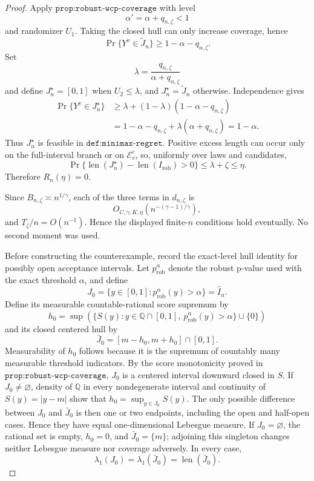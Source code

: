 \documentclass{article}
\begin{document}
\begin{proof}
Apply \(\texttt{prop:robust-wcp-coverage}\) with level
\[
\alpha'=\alpha+q_{n,\zeta}<1
\]
and randomizer \(U_1\). Taking the closed hull can only increase coverage, hence
\[
\Pr\{Y^v\in\widetilde J_n\}
\ge1-\alpha-q_{n,\zeta}.
\]
Set
\[
\lambda=\frac{q_{n,\zeta}}
              {\alpha+q_{n,\zeta}}
\]
and define \(J_n^\star=[0,1]\) when \(U_2\le\lambda\), and \(J_n^\star=\widetilde J_n\) otherwise. Independence gives
\[
\begin{aligned}
\Pr\{Y^v\in J_n^\star\}
&\ge\lambda+(1-\lambda)
 (1-\alpha-q_{n,\zeta})\\
&=1-\alpha-q_{n,\zeta}
 +\lambda(\alpha+q_{n,\zeta})
=1-\alpha.
\end{aligned}
\]
Thus \(J_n^\star\) is feasible in \(\texttt{def:minimax-regret}\). Positive excess length can occur only on the full-interval branch or on \(\mathcal E_v^c\), so, uniformly over laws and candidates,
\[
\Pr\{\operatorname{len}(J_n^\star)
-\operatorname{len}(I_{\mathrm{rob}})>0\}
\le\lambda+\zeta\le\eta.
\]
Therefore \(R_n(\eta)=0\).

Since \(B_{n,\zeta}\asymp n^{1/\gamma}\), each of the three terms in \(d_{n,\zeta}\) is
\[
O_{C,\gamma,K,\eta}
(n^{-(\gamma-1)/\gamma}),
\]
and \(T_\zeta/n=O(n^{-1})\). Hence the displayed finite-\(n\) conditions hold eventually. No second moment was used.

Before constructing the counterexample, record the exact-level hull identity for possibly open acceptance intervals. Let \(p_{\mathrm{rob}}^\alpha\) denote the robust p-value used with the exact threshold \(\alpha\), and define
\[
J_0=\{y\in[0,1]:p_{\mathrm{rob}}^\alpha(y)>\alpha\}
    =\widehat I_n.
\]
Define its measurable countable-rational score supremum by
\[
h_0=\sup\left(
 \{S(y):y\in\mathbb Q\cap[0,1],\
 p_{\mathrm{rob}}^\alpha(y)>\alpha\}\cup\{0\}\right)
\]
and its closed centered hull by
\[
\bar J_0=[m-h_0,m+h_0]\cap[0,1].
\]
Measurability of \(h_0\) follows because it is the supremum of countably many measurable threshold indicators. By the score monotonicity proved in \(\texttt{prop:robust-wcp-coverage}\), \(J_0\) is a centered interval downward closed in \(S\). If \(J_0\ne\varnothing\), density of \(\mathbb Q\) in every nondegenerate interval and continuity of \(S(y)=|y-m|\) show that \(h_0=\sup_{y\in J_0}S(y)\). The only possible difference between \(J_0\) and \(\bar J_0\) is then one or two endpoints, including the open and half-open cases. Hence they have equal one-dimensional Lebesgue measure. If \(J_0=\varnothing\), the rational set is empty, \(h_0=0\), and \(\bar J_0=\{m\}\); adjoining this singleton changes neither Lebesgue measure nor coverage adversely. In every case,
\[
\lambda_1(J_0)=\lambda_1(\bar J_0)
 =\operatorname{len}(\bar J_0).
\]


\end{proof}
\end{document}
